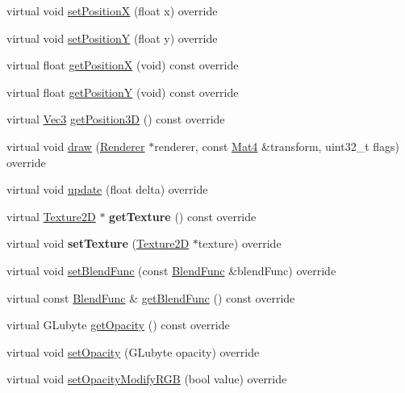 \begin{DoxyCompactItemize}
\item 
virtual void \hyperlink{classMotionStreak_aabc8d8fedcddd0f9e1e77b090ce8f7ed}{set\+PositionX} (float x) override
\item 
virtual void \hyperlink{classMotionStreak_a78b4896032c6ef6e21ce5d9012d82d13}{set\+PositionY} (float y) override
\item 
virtual float \hyperlink{classMotionStreak_a0a7f37b3a4e479cfed0dea79222ad1e6}{get\+PositionX} (void) const override
\item 
virtual float \hyperlink{classMotionStreak_a4138d128c57dad6a41f8d51bbf13a0f8}{get\+PositionY} (void) const override
\item 
virtual \hyperlink{classVec3}{Vec3} \hyperlink{classMotionStreak_afa9dc064ec1140bf1e14e526221d5b72}{get\+Position3D} () const override
\item 
virtual void \hyperlink{classMotionStreak_aba3df66a00afb1a9c46178da191041df}{draw} (\hyperlink{classRenderer}{Renderer} $\ast$renderer, const \hyperlink{classMat4}{Mat4} \&transform, uint32\+\_\+t flags) override
\item 
virtual void \hyperlink{classMotionStreak_a915b84eec6e1e4576d9aa0c1e6528fe7}{update} (float delta) override
\item 
\mbox{\label{classMotionStreak_a780e42516f1e8a879a25052a17370d33}} 
virtual \hyperlink{classTexture2D}{Texture2D} $\ast$ {\bfseries get\+Texture} () const override
\item 
\mbox{\label{classMotionStreak_ad7c24af4799bf80e0f8a3e6f28228d47}} 
virtual void {\bfseries set\+Texture} (\hyperlink{classTexture2D}{Texture2D} $\ast$texture) override
\item 
virtual void \hyperlink{classMotionStreak_adb192a5b33bd7a8f76cf04439f272808}{set\+Blend\+Func} (const \hyperlink{structBlendFunc}{Blend\+Func} \&blend\+Func) override
\item 
virtual const \hyperlink{structBlendFunc}{Blend\+Func} \& \hyperlink{classMotionStreak_ab3949fdfcb758670a815a114799a274d}{get\+Blend\+Func} () const override
\item 
virtual G\+Lubyte \hyperlink{classMotionStreak_a433b068de6c2246676c0654480cb9ea2}{get\+Opacity} () const override
\item 
virtual void \hyperlink{classMotionStreak_a7240b2a7e1340cf0139774421b7ca80e}{set\+Opacity} (G\+Lubyte opacity) override
\item 
virtual void \hyperlink{classMotionStreak_aa140ca21b82d41fbe8c0ba08d8060c3b}{set\+Opacity\+Modify\+R\+GB} (bool value) override

\end{DoxyCompactItemize}
